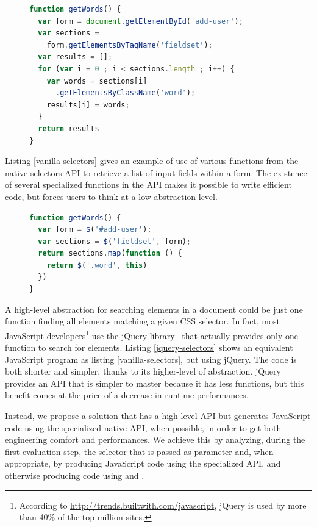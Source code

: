 \documentclass[preprint]{sigplanconf}
\begin{document}
\begin{figure}[htb]
\begin{lstlisting}[language=JavaScript,label=vanilla-selectors,caption=Searching elements using the
native selectors API]
function getWords() {
  var form = document.getElementById('add-user');
  var sections =
    form.getElementsByTagName('fieldset');
  var results = [];
  for (var i = 0 ; i < sections.length ; i++) {
    var words = sections[i]
      .getElementsByClassName('word');
    results[i] = words;
  }
  return results
}
\end{lstlisting}
\end{figure}

Listing \ref{vanilla-selectors} gives an example of use of various functions from the native
selectors API to retrieve a list of input fields within a form. The existence of several
specialized functions in the API makes it possible to write efficient code, but forces users to
think at a low abstraction level.

\begin{figure}[htb]
\begin{lstlisting}[language=JavaScript,label=jquery-selectors,caption=Searching elements in jQuery]
function getWords() {
  var form = $('#add-user');
  var sections = $('fieldset', form);
  return sections.map(function () {
    return $('.word', this)
  })
}
\end{lstlisting}
\end{figure}

A high-level abstraction for searching elements in a document could be just one function
finding all elements matching a given CSS selector. In fact, most JavaScript
developers\footnote{According to
\href{http://trends.builtwith.com/javascript}{http://trends.builtwith.com/javascript}, jQuery is
used by more than 40\% of the top million sites.} use the jQuery library~\cite{Bibeault08_jQuery}
that actually provides only one function to search for elements. Listing \ref{jquery-selectors}
shows an equivalent JavaScript program as listing \ref{vanilla-selectors}, but using jQuery. The
code is both shorter and simpler, thanks to its higher-level of abstraction. jQuery provides an API
that is simpler to master because it has less functions, but this benefit comes at the price of a
decrease in runtime performances.

Instead, we propose a solution that has a high-level API but generates JavaScript code using the
specialized native API, when possible, in order to get both engineering comfort and performances.
We achieve this by analyzing, during the first evaluation step, the selector that is
passed as parameter and, when appropriate, by producing JavaScript code using the specialized API,
and otherwise producing code using  and .
\end{document}
